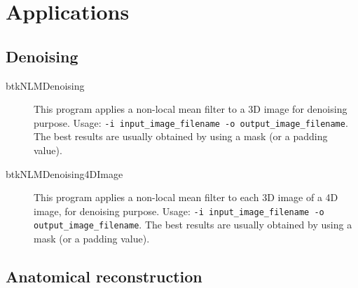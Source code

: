 \section{Applications}

\subsection{Denoising}

\begin{description}
 \item[btkNLMDenoising] This program applies a non-local mean filter to a 3D image for denoising purpose. Usage: \texttt{-i input\_image\_filename -o output\_image\_filename}. The best results are usually obtained by using a mask (or a padding value).
\end{description}

\begin{description}
 \item[btkNLMDenoising4DImage] This program applies a non-local mean filter to each 3D image of a 4D image, for denoising purpose. Usage: \texttt{-i input\_image\_filename -o output\_image\_filename}. The best results are usually obtained by using a mask (or a padding value).
\end{description}


\subsection{Anatomical reconstruction}

